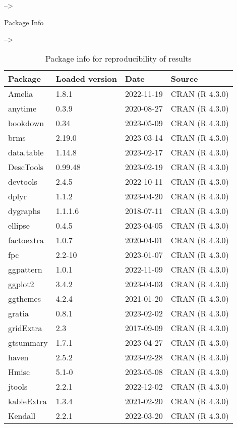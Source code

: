 \documentclass[
]{article}
\begin{document}
--\textgreater{}

Package Info

--\textgreater{}

\begin{table}

\caption{\label{tab:Reproducibility-sessionInfo-R-packages}Package info for reproducibility of results}
\centering
\begin{tabular}[t]{llll}
\toprule
Package & Loaded version & Date & Source\\
\midrule
Amelia & 1.8.1 & 2022-11-19 & CRAN (R 4.3.0)\\
anytime & 0.3.9 & 2020-08-27 & CRAN (R 4.3.0)\\
bookdown & 0.34 & 2023-05-09 & CRAN (R 4.3.0)\\
brms & 2.19.0 & 2023-03-14 & CRAN (R 4.3.0)\\
data.table & 1.14.8 & 2023-02-17 & CRAN (R 4.3.0)\\
\addlinespace
DescTools & 0.99.48 & 2023-02-19 & CRAN (R 4.3.0)\\
devtools & 2.4.5 & 2022-10-11 & CRAN (R 4.3.0)\\
dplyr & 1.1.2 & 2023-04-20 & CRAN (R 4.3.0)\\
dygraphs & 1.1.1.6 & 2018-07-11 & CRAN (R 4.3.0)\\
ellipse & 0.4.5 & 2023-04-05 & CRAN (R 4.3.0)\\
\addlinespace
factoextra & 1.0.7 & 2020-04-01 & CRAN (R 4.3.0)\\
fpc & 2.2-10 & 2023-01-07 & CRAN (R 4.3.0)\\
ggpattern & 1.0.1 & 2022-11-09 & CRAN (R 4.3.0)\\
ggplot2 & 3.4.2 & 2023-04-03 & CRAN (R 4.3.0)\\
ggthemes & 4.2.4 & 2021-01-20 & CRAN (R 4.3.0)\\
\addlinespace
gratia & 0.8.1 & 2023-02-02 & CRAN (R 4.3.0)\\
gridExtra & 2.3 & 2017-09-09 & CRAN (R 4.3.0)\\
gtsummary & 1.7.1 & 2023-04-27 & CRAN (R 4.3.0)\\
haven & 2.5.2 & 2023-02-28 & CRAN (R 4.3.0)\\
Hmisc & 5.1-0 & 2023-05-08 & CRAN (R 4.3.0)\\
\addlinespace
jtools & 2.2.1 & 2022-12-02 & CRAN (R 4.3.0)\\
kableExtra & 1.3.4 & 2021-02-20 & CRAN (R 4.3.0)\\
Kendall & 2.2.1 & 2022-03-20 & CRAN (R 4.3.0)\\

\end{tabular}
\end{table}
\end{document}
